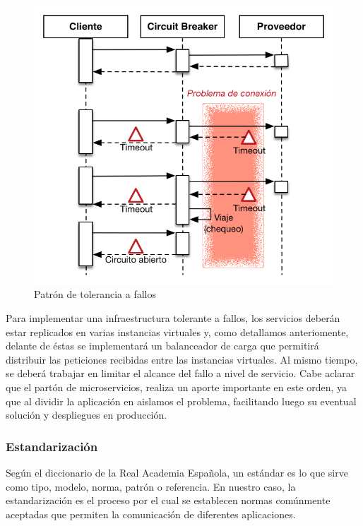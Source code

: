 \begin{figure}[H]
  \includegraphics[width=\linewidth,height=0.5\textheight,keepaspectratio]{src/images/04-capitulo-4/circuit-breaker.png}
  \caption{Patrón de tolerancia a fallos }
  \label{fig:circuit_breaker}
\end{figure}

Para implementar una infraestructura tolerante a fallos, los servicios deberán estar replicados en varias instancias virtuales y, como detallamos anteriomente, delante de éstas se implementará un balanceador de carga que permitirá distribuir las peticiones recibidas entre las instancias virtuales.  Al mismo tiempo, se deberá trabajar en limitar el alcance del fallo a nivel de servicio.  Cabe aclarar que el partón de microservicios, realiza un aporte importante en este orden, ya que al dividir la aplicación en  aislamos el problema, facilitando luego su eventual solución y despliegues en producción.

\subsubsection{Estandarización}

Según el diccionario de la Real Academia Española, un estándar es lo que sirve como tipo, modelo, norma, patrón o referencia. En nuestro caso, la estandarización es el proceso por el cual se establecen normas comúnmente aceptadas que permiten la comunicación de diferentes aplicaciones.

